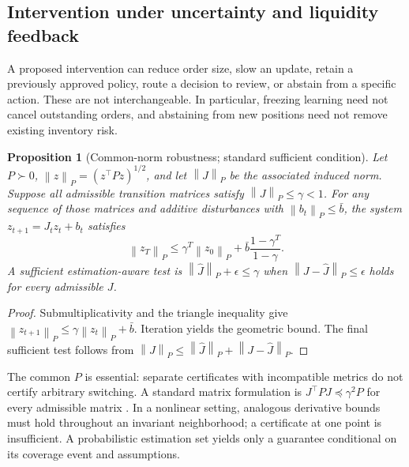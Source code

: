 \documentclass[10pt,twocolumn,letterpaper]{article}
\newtheorem{proposition}[theorem]{Proposition}
\theoremstyle{definition}
\theoremstyle{remark}
\newcommand{\norm}[1]{\left\lVert #1\right\rVert}
\begin{document}
\label{sec:ch8}

\subsection{Intervention under uncertainty and liquidity feedback}
\label{sec:intervention}
A proposed intervention can reduce order size, slow an update, retain a previously approved policy, route a decision to review, or abstain from a specific action. These are not interchangeable. In particular, freezing learning need not cancel outstanding orders, and abstaining from new positions need not remove existing inventory risk.

\begin{proposition}[Common-norm robustness; standard sufficient condition]
\label{prop:robust}
Let $P\succ0$, $\norm{z}_P=(z^\top Pz)^{1/2}$, and let $\norm{J}_P$ be the associated induced norm. Suppose all admissible transition matrices satisfy $\norm{J}_P\leq\gamma<1$. For any sequence of those matrices and additive disturbances with $\norm{b_t}_P\leq\bar b$, the system $z_{t+1}=J_tz_t+b_t$ satisfies
\begin{equation}
 \norm{z_T}_P\leq\gamma^T\norm{z_0}_P+
 \bar b\frac{1-\gamma^T}{1-\gamma}.
 \label{eq:robustbound}
\end{equation}
A sufficient estimation-aware test is $\norm{\widehat J}_P+\epsilon\leq\gamma$ when $\norm{J-\widehat J}_P\leq\epsilon$ holds for every admissible $J$.
\end{proposition}
\begin{proof}
Submultiplicativity and the triangle inequality give $\norm{z_{t+1}}_P\leq\gamma\norm{z_t}_P+\bar b$. Iteration yields the geometric bound. The final sufficient test follows from $\norm{J}_P\leq\norm{\widehat J}_P+\norm{J-\widehat J}_P$.
\end{proof}
The common $P$ is essential: separate certificates with incompatible metrics do not certify arbitrary switching. A standard matrix formulation is $J^\top PJ\preceq\gamma^2P$ for every admissible matrix \citep{boyd1994}. In a nonlinear setting, analogous derivative bounds must hold throughout an invariant neighborhood; a certificate at one point is insufficient. A probabilistic estimation set yields only a guarantee conditional on its coverage event and assumptions.
\end{document}
